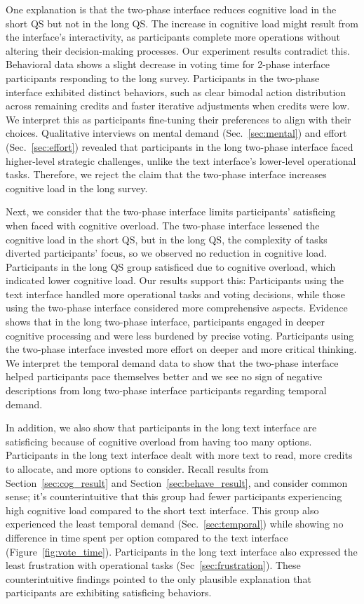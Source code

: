 One explanation is that the two-phase interface reduces cognitive load in the short QS but not in the long QS. The increase in cognitive load might result from the interface's interactivity, as participants complete more operations without altering their decision-making processes. Our experiment results contradict this. Behavioral data shows a slight decrease in voting time for 2-phase interface participants responding to the long survey. Participants in the two-phase interface exhibited distinct behaviors, such as clear bimodal action distribution across remaining credits and faster iterative adjustments when credits were low. We interpret this as participants fine-tuning their preferences to align with their choices. Qualitative interviews on mental demand (Sec.~\ref{sec:mental}) and effort (Sec.~\ref{sec:effort}) revealed that participants in the long two-phase interface faced higher-level strategic challenges, unlike the text interface's lower-level operational tasks. Therefore, we reject the claim that the two-phase interface increases cognitive load in the long survey.

Next, we consider that the two-phase interface limits participants' satisficing when faced with cognitive overload. The two-phase interface lessened the cognitive load in the short QS, but in the long QS, the complexity of tasks diverted participants' focus, so we observed no reduction in cognitive load. Participants in the long QS group satisficed due to cognitive overload, which indicated lower cognitive load. Our results support this: Participants using the text interface handled more operational tasks and voting decisions, while those using the two-phase interface considered more comprehensive aspects. Evidence shows that in the long two-phase interface, participants engaged in deeper cognitive processing and were less burdened by precise voting. Participants using the two-phase interface invested more effort on deeper and more critical thinking. We interpret the temporal demand data to show that the two-phase interface helped participants pace themselves better and we see no sign of negative descriptions from long two-phase interface participants regarding temporal demand.

In addition, we also show that participants in the long text interface are satisficing because of cognitive overload from having too many options. Participants in the long text interface dealt with more text to read, more credits to allocate, and more options to consider. Recall results from Section~\ref{sec:cog_result} and Section~\ref{sec:behave_result}, and consider common sense; it's counterintuitive that this group had fewer participants experiencing high cognitive load compared to the short text interface. This group also experienced the least temporal demand (Sec.~\ref{sec:temporal}) while showing no difference in time spent per option compared to the text interface (Figure~\ref{fig:vote_time}). Participants in the long text interface also expressed the least frustration with operational tasks (Sec~\ref{sec:frustration}). These counterintuitive findings pointed to the only plausible explanation that participants are exhibiting satisficing behaviors. 

